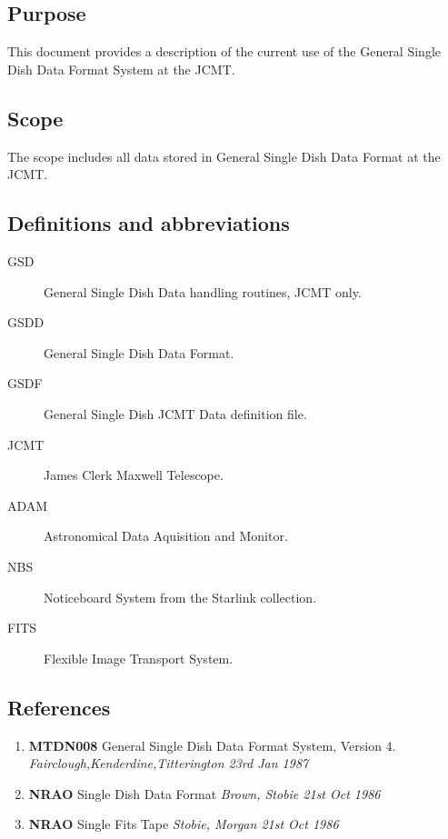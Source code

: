 \subsection{Purpose}

  This document provides a description of the current use of
the General Single Dish Data Format System at the JCMT.


\subsection{Scope}

  The scope includes all data stored in General Single Dish Data Format
at the JCMT.

\subsection{Definitions and abbreviations}
\begin{description}
\item [GSD]      General Single Dish Data handling routines, JCMT only.
\item [GSDD]     General Single Dish Data Format.
\item [GSDF]     General Single Dish JCMT Data definition file.  
\item [JCMT]     James Clerk Maxwell Telescope. 
\item [ADAM]     Astronomical Data Aquisition and Monitor.
\item [NBS]      Noticeboard System from the Starlink collection.
\item [FITS]     Flexible Image Transport System.
\end{description}


\subsection{References}

\begin{enumerate}
  \item {\bf MTDN008} General Single Dish Data Format System, Version 4.  
        {\em Fairclough,Kenderdine,Titterington 23rd Jan 1987}
  \item {\bf NRAO} Single Dish Data Format {\em Brown, Stobie 21st Oct 1986}
  \item {\bf NRAO} Single Fits Tape {\em Stobie, Morgan 21st Oct 1986}
\end{enumerate}




